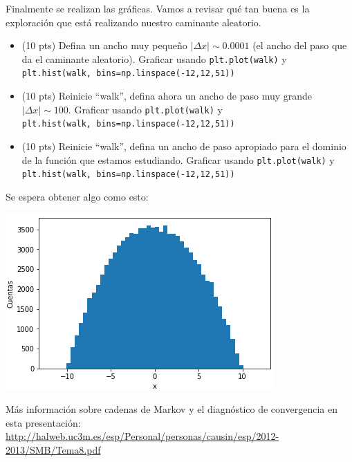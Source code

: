 \documentclass{article}
\begin{document}
Finalmente se realizan las gráficas. Vamos a revisar qué tan buena es la exploración que está realizando
nuestro caminante aleatorio.

\begin{itemize}
\item (10 pts) Defina un ancho muy pequeño $|\Delta x|  \sim 0.0001$ (el ancho del paso que da el caminante
  aleatorio). Graficar usando \texttt{plt.plot(walk)} y
  \texttt{plt.hist(walk, bins=np.linspace(-12,12,51))}
\item (10 pts) Reinicie ``walk'', defina ahora un ancho de paso muy grande $|\Delta x| \sim 100$.
  Graficar usando \texttt{plt.plot(walk)} y \\   \texttt{plt.hist(walk, bins=np.linspace(-12,12,51))}
\item (10 pts) Reinicie ``walk'', defina un ancho de paso apropiado para el dominio de la función que estamos
  estudiando. Graficar usando \texttt{plt.plot(walk)} y   \texttt{plt.hist(walk, bins=np.linspace(-12,12,51))}
\end{itemize}

Se espera obtener algo como esto:

\includegraphics{hw12_hist.png}

Más información sobre cadenas de Markov y el diagnóstico de convergencia en esta presentación:
\url{http://halweb.uc3m.es/esp/Personal/personas/causin/esp/2012-2013/SMB/Tema8.pdf}
\end{document}
